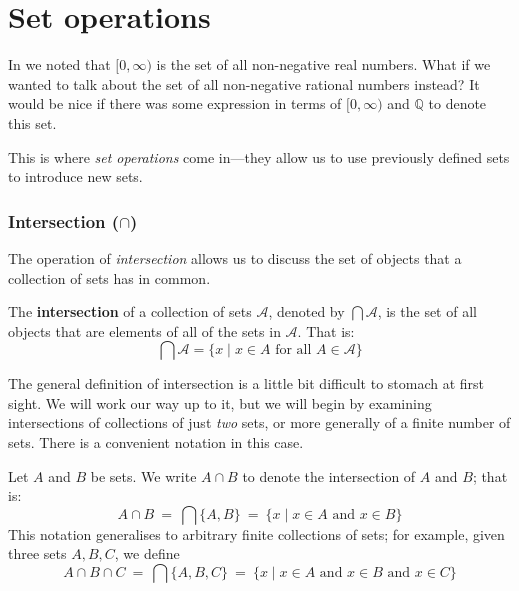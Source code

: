 \section{Set operations}

In  we noted that $[0,\infty)$ is the set of all non-negative real numbers. What if we wanted to talk about the set of all non-negative rational numbers instead? It would be nice if there was some expression in terms of $[0,\infty)$ and $\mathbb{Q}$ to denote this set.

This is where \textit{set operations} come in---they allow us to use previously defined sets to introduce new sets.

\subsubsection*{Intersection ($\cap$)}

The operation of \textit{intersection} allows us to discuss the set of objects that a collection of sets has in common.

\begin{definition}
\label{defIntersection}
The \textbf{intersection} of a collection of sets $\mathcal{A}$, denoted by $\bigcap \mathcal{A}$, is the set of all objects that are elements of all of the sets in $\mathcal{A}$. That is:
\[ \bigcap \mathcal{A} = \{ x \mid x \in A \text{ for all } A \in \mathcal{A} \} \]
\end{definition}


The general definition of intersection is a little bit difficult to stomach at first sight. We will work our way up to it, but we will begin by examining intersections of collections of just \textit{two} sets, or more generally of a finite number of sets. There is a convenient notation in this case.

\begin{notation}
\label{ntnIntersectionPairwise}
Let $A$ and $B$ be sets. We write $A \cap B$ to denote the intersection of $A$ and $B$; that is:
\[ A \cap B ~=~ \bigcap \{ A, B \} ~=~ \{ x \mid x \in A \text{ and } x \in B \} \]
This notation generalises to arbitrary finite collections of sets; for example, given three sets $A,B,C$, we define
\[ A \cap B \cap C ~=~ \bigcap \{ A, B, C \} ~=~ \{ x \mid x \in A \text{ and } x \in B \text{ and } x \in C \} \]
\end{notation}

